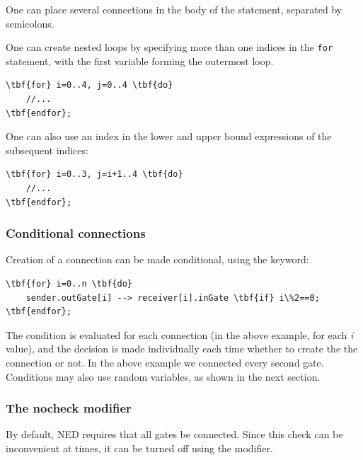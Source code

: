 One can place several connections in the body of the
 statement, separated by semicolons.

One can create nested loops
by specifying more than one indices in the \texttt{for} statement,
with the first variable forming the outermost loop.

\begin{Verbatim}[commandchars=\\\{\}]
\tbf{for} i=0..4, j=0..4 \tbf{do}
    //...
\tbf{endfor};
\end{Verbatim}

One can also use an index in the lower and upper bound expressions
of the subsequent indices:

\begin{Verbatim}[commandchars=\\\{\}]
\tbf{for} i=0..3, j=i+1..4 \tbf{do}
    //...
\tbf{endfor};
\end{Verbatim}


\subsubsection{Conditional connections}


Creation of a connection can be made conditional, using the 
keyword:


\begin{Verbatim}[commandchars=\\\{\}]
\tbf{for} i=0..n \tbf{do}
    sender.outGate[i] --> receiver[i].inGate \tbf{if} i\%2==0;
\tbf{endfor};
\end{Verbatim}

The  condition is evaluated for each connection
(in the above example, for each \textit{i} value), and the
decision is made individually each time whether to create the
the connection or not. In the above example we connected every
second gate. Conditions may also use random variables, as
shown in the next section.


\subsubsection{The nocheck modifier}

By default, NED requires that all gates be connected. Since this
check can be inconvenient at times, it can be turned off
using the  modifier.

